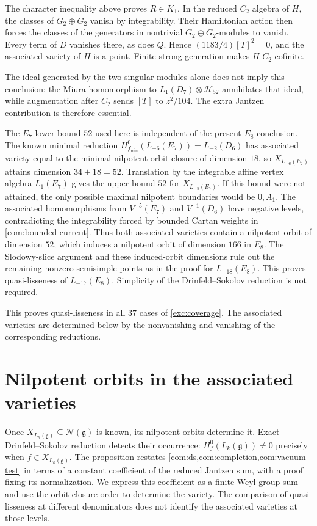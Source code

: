 \documentclass[11pt,a4paper]{amsart}
\numberwithin{equation}{section}
\theoremstyle{definition}
\theoremstyle{remark}
\newcommand{\g}{\mathfrak g}
\newcommand{\N}{\mathcal N}
\begin{document}
The character inequality above proves $R\in K_1$. In the reduced
$C_2$ algebra of $H$, the classes of $G_2\oplus G_2$ vanish by
integrability. Their Hamiltonian action then forces the classes of
the generators in nontrivial $G_2\oplus G_2$-modules to vanish.
Every term of $D$ vanishes there, as does $Q$. Hence
$(1183/4)[T]^2=0$, and the associated variety of $H$ is a point. Finite strong
generation makes $H$ $C_2$-cofinite.

The ideal generated by the two singular modules alone does not imply
this conclusion: the Miura homomorphism to
$L_1(D_7)\otimes\mathcal H_{52}$ annihilates that ideal, while
augmentation after $C_2$ sends $[T]$ to $z^2/104$. The extra Jantzen contribution is therefore essential.

The $E_7$ lower bound $52$ used here is independent of the present
$E_8$ conclusion. The known minimal reduction
$H^0_{f_{\min}}(L_{-6}(E_7))=L_{-2}(D_6)$ has associated variety
equal to the minimal nilpotent orbit closure of dimension $18$, so
$X_{L_{-6}(E_7)}$ attains dimension $34+18=52$.
Translation by the integrable affine vertex algebra $L_1(E_7)$ gives
the upper bound $52$ for $X_{L_{-5}(E_7)}$. If this bound were not attained, the only
possible maximal nilpotent boundaries would be $0,A_1$. The associated homomorphisms from $V^{-5}(E_7)$ and $V^{-1}(D_6)$
have negative levels, contradicting the integrability forced by bounded
Cartan weights in \cref{com:bounded-current}. Thus
both associated varieties contain a nilpotent orbit of dimension $52$,
which induces a nilpotent orbit of dimension $166$ in $E_8$.
The Slodowy-slice argument and these induced-orbit dimensions rule out the
remaining nonzero semisimple points as in the proof for $L_{-18}(E_8)$.
This proves quasi-lisseness of $L_{-17}(E_8)$. Simplicity of the Drinfeld--Sokolov
reduction is not required.


This proves quasi-lisseness in all $37$ cases of
\cref{exc:coverage}. The associated varieties are determined below
by the nonvanishing and vanishing of the corresponding reductions.

\section{Nilpotent orbits in the associated varieties}\label{cert:orbits}
Once $X_{L_k(\g)}\subseteq\N(\g)$ is known, its nilpotent orbits
determine it. Exact Drinfeld--Sokolov reduction detects their occurrence:
$H_f^0(L_k(\g))\ne0$ precisely when $f\in X_{L_k(\g)}$.
The proposition restates \cref{com:ds,com:completion,com:vacuum-test}
in terms of a constant coefficient of the reduced Jantzen sum, with a
proof fixing its normalization. We express this coefficient as a finite
Weyl-group sum and use the orbit-closure order to determine the variety.
The comparison of quasi-lisseness at different denominators does not
identify the associated varieties at those levels.
\end{document}
